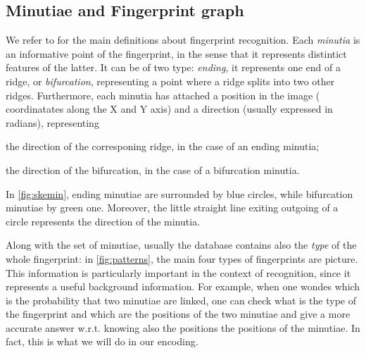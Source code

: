 \documentclass[8pt]{article}
\begin{document}
\subsection{Minutiae and Fingerprint graph}
\label{sub:backfinger}
We refer to \cite{maltoni2009handbook} for the main definitions about
fingerprint recognition.  Each \emph{minutia} is an informative point of the
fingerprint, in the sense that it represents distintict features of the latter.
It can be of two type: \emph{ending}, \ie it represents one end of a ridge, or
\emph{bifurcation}, representing a point where a ridge splits into two other
ridges.  Furthermore, each minutia has attached a position in the image (\ie
coordinatates along the X and Y axis) and a direction (usually expressed in
radians), representing 
\begin{enumerate*}[label=\roman*)]
  \item the direction of the corresponing ridge, in the case of an ending
        minutia;
  \item the direction of the bifurcation, in the case of a bifurcation minutia.
\end{enumerate*}
In \cref{fig:skemin}, ending minutiae are surrounded by blue circles, while
bifurcation minutiae by green one. Moreover, the little straight line exiting
outgoing of a circle represents the direction of the minutia. 

Along with the set of minutiae, usually the database contains also the
\emph{type} of the whole fingerprint: in \cref{fig:patterns}, the main four
types of fingerprints are picture. This information is particularly important
in the context of recognition, since it represents a useful background
information.  For example, when one wondes which is the probability that two
minutiae are linked, one can check what is the type of the fingerprint and
which are the positions of the two minutiae and give a more accurate answer
w.r.t. knowing also the positions the positions of the minutiae.  In fact, this
is what we will do in our encoding.
    
\end{document}
